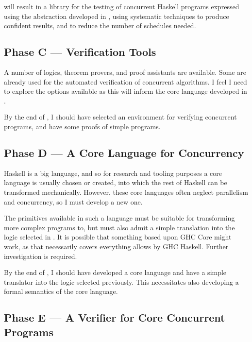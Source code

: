  will result in a library for the testing of concurrent
Haskell programs expressed using the abstraction developed in
, using systematic techniques to produce confident results,
and to reduce the number of schedules needed.

\subsection{Phase C --- Verification Tools}
\label{sec:proposal-strategy-tools}


A number of logics, theorem provers, and proof assistants are
available. Some are already used for the automated verification of
concurrent algorithms. I feel I need to explore the options available
as this will inform the core language developed in .

By the end of , I should have selected an environment for
verifying concurrent programs, and have some proofs of simple
programs.

\subsection{Phase D --- A Core Language for Concurrency}
\label{sec:proposal-strategy-core}


Haskell is a big language, and so for research and tooling purposes a
core language is usually chosen or created, into which the rest of
Haskell can be transformed mechanically. However, these core languages
often neglect parallelism and concurrency, so I must develop a new
one.

The primitives available in such a language must be suitable for
transforming more complex programs to, but must also admit a simple
translation into the logic selected in . It is possible that
something based upon GHC Core might work, as that necessarily covers
everything allows by GHC Haskell. Further investigation is required.

By the end of , I should have developed a core language and
have a simple translator into the logic selected previously. This
necessitates also developing a formal semantics of the core language.

\subsection{Phase E --- A Verifier for Core Concurrent Programs}
\label{sec:proposal-strategy-verifier}

